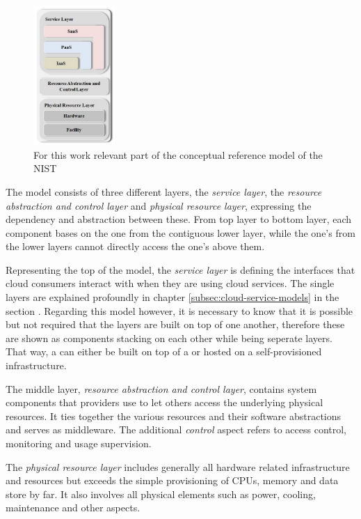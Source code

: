 \begin{figure}[H] %
	\centering
		\includegraphics[width=0.275\textwidth]{images/cc_reference_part.png}
	\caption{For this work relevant part of the conceptual reference model of the NIST \cite{liu2012reference}}
\end{figure}

The  model consists of three different layers, the \textit{service layer}, the \textit{resource abstraction and control layer} and \textit{physical resource layer}, expressing the dependency and abstraction between these. From top layer to bottom layer, each component bases on the one from the contiguous lower layer, while the one's from the lower layers cannot directly access the one's above them.

Representing the top of the model, the \textit{service layer} is defining the interfaces that cloud consumers interact with when they are using cloud services. The single layers are explained profoundly in chapter \ref{subsec:cloud-service-models} in the section . Regarding this model however, it is necessary to know that it is possible but not required that the layers are built on top of one another, therefore these are shown as components stacking on each other while being seperate layers. That way, a  can either be built on top of a  or hosted on a self-provisioned infrastructure.

The middle layer, \textit{resource abstraction and control layer}, contains system components that providers use to let others access the underlying physical resources. It ties together the various resources and their software abstractions and serves as middleware. The additional \textit{control} aspect refers to access control, monitoring and usage supervision.

The \textit{physical resource layer} includes generally all hardware related infrastructure and resources but exceeds the simple provisioning of CPUs, memory and data store by far. It also involves all physical elements such as power, cooling, maintenance and other aspects.

